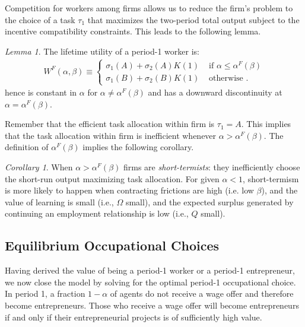\documentclass[12pt,american]{paper}
\theoremstyle{remark}
\newtheorem{lemma}{Lemma}
\newtheorem{cor}{Corollary}
\begin{document}
Competition for workers among firms allows us to reduce the firm's problem to the choice of a task $\tau_1$ that maximizes the two-period total output subject to the incentive compatibility constraints. This leads to the following lemma.
\begin{lemma}
The lifetime utility of a period-1 worker is:
\begin{align}\label{eq: value worker}
W^F(\alpha,\beta) \equiv
\begin{cases}
\sigma_1(A)+\sigma_2(A) K(1) &\text{ if } \alpha \leq \alpha^F(\beta)\\
\sigma_1(B)+\sigma_2(B) K(1) &\text{ otherwise }.
\end{cases}
\end{align}
hence is constant in $\alpha$ for $\alpha \neq \alpha^F(\beta)$ and has a downward discontinuity at $\alpha=\alpha^F(\beta)$.
\end{lemma}

Remember that the efficient task allocation within firm is $\tau_1=A$. This implies that the task allocation within firm is inefficient whenever  $\alpha>\alpha^F(\beta)$. The definition of $\alpha^F(\beta)$ implies the following corollary.
\begin{cor}
When $\alpha > \alpha^F(\beta)$ firms are \textit{short-termists}: they inefficiently choose the short-run output maximizing task allocation. For given $\alpha<1$, short-termism is more likely  to happen when  contracting frictions are high (i.e. low $\beta$),   and the value of learning   is small (i.e., $\Omega$ small), and the expected surplus generated by continuing an employment relationship is low (i.e., $Q$ small). 
\end{cor}




\subsection{Equilibrium Occupational Choices}

Having derived the value of being a period-1 worker or a period-1 entrepreneur, we now close the model by solving for the optimal period-1 occupational choice. In period 1, a fraction  $1-\alpha$ of agents do not receive a wage offer and therefore become entrepreneurs. Those who receive a wage offer will become entrepreneurs if and only if their entrepreneurial projects is of sufficiently high value.
\end{document}
